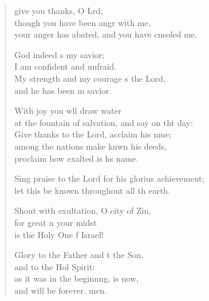 \settowidth{\versewidth}{Sing praise to the Lord for his glorious achievement; *}
\begin{verse}%
  \begin{patverse}
     give you thanks, O Lrd;\Flex\\
though you have been angr with me,\Med\\
your anger has abated, and you have cnsoled me.

God indeed \pointup{\i}s my savior;\Med\\
I am confident and unfraid.\\
My strength and my courage \pointup{\i}s the Lord,\Med\\
and he has been m savior.

With joy you w\pointup{\i}ll draw water\Med\\
at the fountain of salvation, and say on tht day:\\
Give thanks to the Lord, acclaim his nme;\Flex\\
among the nations make knwn his deeds,\Med\\
proclaim how exalted is h\pointup{\i}s name.

Sing praise to the Lord for his glorius achievement;\Med\\
let this be known throughout all th earth.

Shout with exultation, O city of Zin,\Flex\\
for great \pointup{\i}n your midst\Med\\
is the Holy One f Israel!

Glory to the Father and t the Son,\Med\\
and to the Hol Spirit:\\
as it was in the beginn\pointup{\i}ng, is now,\Med\\
and will be forever. men. 
  \end{patverse}
\end{verse}
